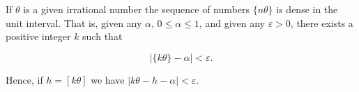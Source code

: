 If $\theta$ is a given irrational number the sequence of numbers $\{n\theta\}$ is dense in the unit interval. That is, given any $\alpha$, $0 \leq \alpha \leq 1$, and given any $\varepsilon > 0$, there exists a positive integer $k$ such that

$$|\{k\theta\} - \alpha| < \varepsilon.$$

Hence, if $h = [k\theta]$ we have $|k\theta - h - \alpha| < \varepsilon$.
